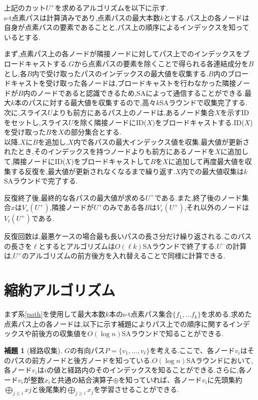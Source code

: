 \documentclass{thesis}
\theoremstyle{definition}
\newtheorem{lemma}{補題}
\begin{document}
上記のカット$U^+$を求めるアルゴリズムを以下に示す.\\
s-t点素パスは計算済みであり,点素パスの最大本数$k$とする.パス上の各ノードは自身が点素パスの要素であることと,パス上の順序によるインデックスを知っているとする.\par
まず,点素パス上の各ノードが隣接ノードに対してパス上でのインデックスをブロードキャストする.$G$から点素パスの要素を除くことで得られる各連結成分を$B$とし,各$B$内で受け取ったパスのインデックスの最大値を収集する.$B$内のブロードキャストを受け取った各ノードは,ブロードキャストを行わなかった隣接ノードが$B$内のノードであると認識できるため,SAによって通信することができる.最大$k$本のパスに対する最大値を収集するので,高々$k$SAラウンドで収集完了する.\\
次に,スライス$U$よりも前方にあるパス上のノードは,あるノード集合$X$を示すIDをセットし,スライス$U$を除く隣接ノードにID($X$)をブロードキャストする.ID($X$)を受け取った$B$を$X$の部分集合とする.\\
以降,$X$に$B$を追加し,$X$内で各パスの最大インデックス値を収集.最大値が更新されたとき,そのインデックスを持つノードよりも前方にあるノードを$X$に追加して,隣接ノードにID($X$)をブロードキャストして$B$を$X$に追加して再度最大値を収集する反復を,最大値が更新されなくなるまで繰り返す.$X$内での最大値収集は$k$SAラウンドで完了する.\par
反復終了後,最終的な各パスの最大値が求める$U^+$である.また,終了後のノード集合$x$は$V_s(U^+)$,隣接ノードが$U^+$のみである各$B$は$V_r(U^+)$,それ以外のノードは$V_t(U^+)$である.\par
反復回数は,最悪ケースの場合最も長いパスの長さ分だけ繰り返される.このパスの長さを$\ell$とするとアルゴリズムは$O(\ell k)$SAラウンドで終了する.$U^-$の計算は,$U^+$のアルゴリズムの前方後方を入れ替えることで同様に計算できる.

\section{縮約アルゴリズム}
まず系\ref{path}を使用して最大本数$k$本のs-t点素パス集合$\{f_1, \dots f_k\}$を求める.求めた点素パス上の各ノードは,以下に示す補題によりパス上での順序に関するインデックスや前後方の収集値を$O(\log n)$SAラウンドで知ることができる.

\begin{lemma}[経路収集\cite{li2018distributed}]
    $G$の有向パス$P = \{v_1,...,v_\ell\}$を考える.ここで、各ノード$v_i$はそのパスの前方ノードと後方ノードを知っている.$O(\log n)$SAラウンドにおいて,各ノード$v_i$は$i$の値と経路内のそのインデックスを知ることができる.さらに,各ノード$v_i$が整数$x_i$と共通の結合演算子$\oplus$を知っていれば、各ノード$v_i$に先頭集約$\bigoplus_{j\leq i}xj$と後尾集約$\bigoplus_{j\geq i}x_j$を学習させることができる.
  \end{lemma}
\end{document}
